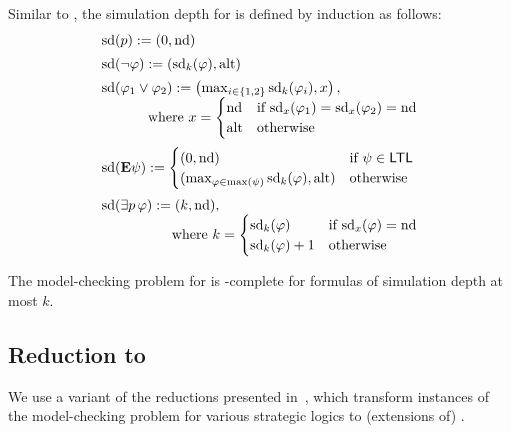 Similar to \SLref, the simulation depth for \QCTLs is defined
by induction as follows:
      \[
        \begin{array}{l}
          \ndd(p) \egdef (0,\nd)\\[5pt]
          
          \ndd(\neg \phi) \egdef (\ndd_k(\phi),\alt)\\[5pt]
          
          \ndd(\phi_1\ou\phi_2) \egdef \left
          (\max_{i\in\{1,2\}}\ndd_k(\phi_i), x \right ),\\
          \hfill \mbox{where
          }x=
          \begin{cases}
            \nd & \mbox{if }\ndd_x(\phi_1)=\ndd_x(\phi_2)=\nd\\
            \alt & \mbox{otherwise}
          \end{cases}
          \\[15pt]
   \ndd(\E\psi)\egdef
          \begin{cases}
            (0,\nd) & \mbox{if }\psi\in\LTL\\
            (\max_{\phi\in\max(\psi)}\ndd_k(\phi), \alt) & \mbox{otherwise}
          \end{cases}
          \\[15pt]
          \ndd(\existsp\phi)\egdef (k,\nd),\\
          \hfill\quad\quad\quad\quad\quad\mbox{where }
          k=\begin{cases}
            \ndd_k(\phi) & \mbox{if }\ndd_x(\phi)=\nd \\
            \ndd_k(\phi)+1 & \mbox{otherwise}
          \end{cases}                              
        \end{array}
      \]

\begin{theorem}[]
  \label{theo-qctls}
  The model-checking problem for \QCTLs is \kEXPTIME[(k+1)]-complete for
  formulas of simulation depth at most $k$.
\end{theorem}

\subsection{Reduction to \QCTLs}
\label{sec-reduction}

We use a variant of the reductions presented
in~\cite{DBLP:journals/iandc/LaroussinieM15,DBLP:conf/csl/FijalkowMMR18,BMMRV17,DBLP:conf/kr/MaubertM18,DBLP:conf/ijcai/BouyerKMMMP19},
which transform instances of the model-checking problem for various
strategic logics to (extensions of) \QCTLs.

